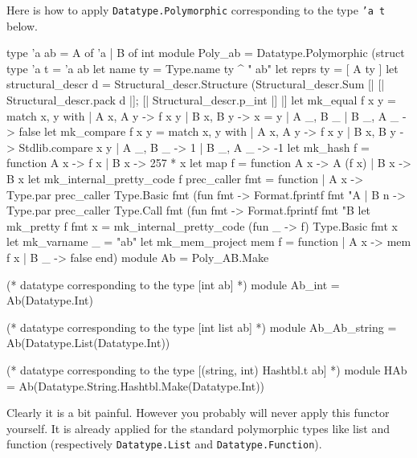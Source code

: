 \begin{example}
Here is how to apply \texttt{Datatype.Polymorphic} corresponding to the type
\texttt{'a t} below.
\begin{ocamlcode}
type 'a ab = A of 'a | B of int
module Poly_ab =
  Datatype.Polymorphic
    (struct
       type 'a t = 'a ab
       let name ty = Type.name ty ^ " ab"
       let reprs ty = [ A ty ]
       let structural_descr d =
         Structural_descr.Structure
          (Structural_descr.Sum
            [| [| Structural_descr.pack d |]; [| Structural_descr.p_int |] |]
       let mk_equal f x y = match x, y with
         | A x, A y -> f x y
         | B x, B y -> x = y
         | A _, B _ | B _, A _ -> false
       let mk_compare f x y =  match x, y with
         | A x, A y -> f x y
         | B x, B y -> Stdlib.compare x y
         | A _, B _ -> 1
         | B _, A _ -> -1
      let mk_hash f = function A x -> f x | B x -> 257 * x
      let map f = function A x -> A (f x) | B x -> B x
      let mk_internal_pretty_code f prec_caller fmt = function
        | A x ->
          Type.par
            prec_caller
            Type.Basic
            fmt
            (fun fmt -> Format.fprintf fmt "A %
        | B n ->
          Type.par
            prec_caller
            Type.Call
            fmt
            (fun fmt -> Format.fprintf fmt "B %
      let mk_pretty f fmt x =
        mk_internal_pretty_code (fun _ -> f) Type.Basic fmt x
      let mk_varname _ = "ab"
      let mk_mem_project mem f = function
        | A x -> mem f x
        | B _ -> false
     end)
module Ab = Poly_AB.Make

(* datatype corresponding to the type [int ab] *)
module Ab_int = Ab(Datatype.Int)

(* datatype corresponding to the type [int list ab] *)
module Ab_Ab_string = Ab(Datatype.List(Datatype.Int))

(* datatype corresponding to the type [(string, int) Hashtbl.t ab] *)
module HAb = Ab(Datatype.String.Hashtbl.Make(Datatype.Int))
\end{ocamlcode}
\end{example}
Clearly it is a bit painful. However you probably will never apply this
functor yourself. It is already applied for the standard \ocaml polymorphic
types like list and function (respectively
\texttt{Datatype.List} and
\texttt{Datatype.Function}).

